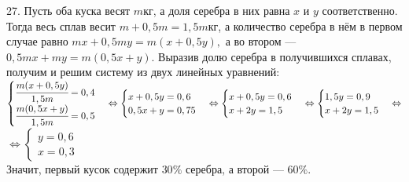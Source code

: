 27. Пусть оба куска весят $m$кг, а доля серебра в них равна $x$ и $y$ соответственно. Тогда весь сплав весит $m+0,5m=1,5m$кг, а количество серебра в нём в первом случае равно $mx+0,5my=m(x+0,5y),$ а во втором --- $0,5mx+my=m(0,5x+y).$ Выразив долю серебра в получившихся сплавах, получим и решим систему из двух линейных уравнений:\\
$\begin{cases}
\cfrac{m(x+0,5y)}{1,5m}=0,4\\
\cfrac{m(0,5x+y)}{1,5m}=0,5
\end{cases}
\Leftrightarrow
\begin{cases}
x+0,5y=0,6\\
0,5x+y=0,75
\end{cases}
\Leftrightarrow
\begin{cases}
x+0,5y=0,6\\
x+2y=1,5
\end{cases}
\Leftrightarrow
\begin{cases}
1,5y=0,9\\
x+2y=1,5
\end{cases}
\Leftrightarrow$\\$\Leftrightarrow
\begin{cases}
y=0,6\\
x=0,3
\end{cases}
$\\
Значит, первый кусок содержит $30\%$ серебра, а второй --- $60\%.$\\
